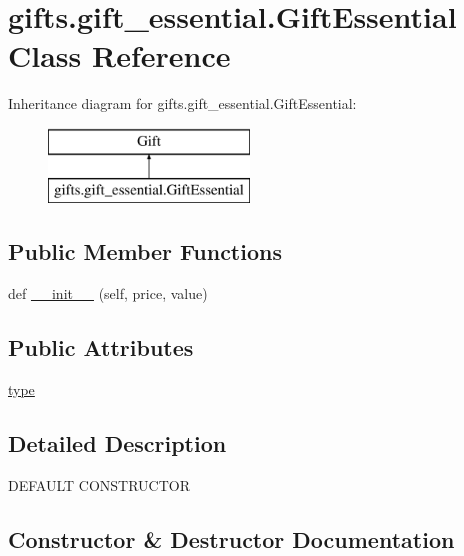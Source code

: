 \hypertarget{classgifts_1_1gift__essential_1_1_gift_essential}{}\section{gifts.\+gift\+\_\+essential.\+Gift\+Essential Class Reference}
\label{classgifts_1_1gift__essential_1_1_gift_essential}
Inheritance diagram for gifts.\+gift\+\_\+essential.\+Gift\+Essential\+:\begin{figure}[H]
\begin{center}
\leavevmode
\includegraphics[height=2.000000cm]{classgifts_1_1gift__essential_1_1_gift_essential}
\end{center}
\end{figure}
\subsection*{Public Member Functions}
\begin{DoxyCompactItemize}
\item 
def \hyperlink{classgifts_1_1gift__essential_1_1_gift_essential_a8a731c925bb09c3b3f8b4110b96c1c08}{\+\_\+\+\_\+init\+\_\+\+\_\+} (self, price, value)
\end{DoxyCompactItemize}
\subsection*{Public Attributes}
\begin{DoxyCompactItemize}
\item 
\hyperlink{classgifts_1_1gift__essential_1_1_gift_essential_a57225de66cf1472099d0762784ffdbbb}{type}
\end{DoxyCompactItemize}


\subsection{Detailed Description}
\begin{DoxyVerb}DEFAULT CONSTRUCTOR\end{DoxyVerb}
 

\subsection{Constructor \& Destructor Documentation}
